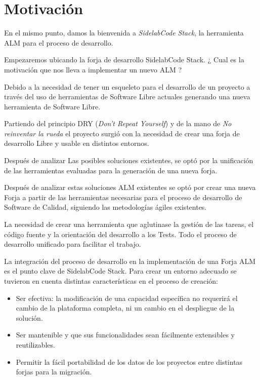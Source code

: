 \chapter{Motivaci\'on}
\label{chap:motivacion}

\par En el mismo punto, damos la bienvenida a \emph{SidelabCode Stack}, la herramienta ALM para el proceso de desarrollo.

\par Empezaremos ubicando la forja de desarrollo SidelabCode Stack. ¿ Cual es la motivaci\'on que nos lleva a implementar un nuevo ALM ?

\par Debido a la necesidad de tener un esqueleto para el desarrollo de un proyecto a trav\'es del uso de herramientas de Software Libre actuales generando una nueva herramienta de Software Libre.

\par Partiendo del principio DRY (\emph{Don't Repeat Yourself}) y de la mano de \emph{No reinventar la rueda} el proyecto surgi\'o con la necesidad de crear una forja de desarrollo Libre y usable en distintos entornos.

\par Despu\'es de analizar Las posibles soluciones existentes, se opt\'o por la unificaci\'on de las herramientas evaluadas para la generaci\'on de una nueva forja. 

\par Despu\'es de analizar estas soluciones ALM existentes se opt\'o por crear una nueva Forja a partir de las herramientas necesarias para el proceso de desarrollo de Software de Calidad, siguiendo las metodolog\'ias \'agiles existentes.

\par La necesidad de crear una herramienta que aglutinase la gestión de las tareas, el código fuente y la orientación del desarrollo a los Tests. Todo el proceso de desarrollo unificado para facilitar el trabajo.

\par La integraci\'on del proceso de desarrollo en la implementaci\'on de una Forja ALM es el punto clave de SidelabCode Stack. Para crear un entorno adecuado se tuvieron en cuenta distintas características en el proceso de creación:

\begin{itemize}
	\item Ser efectiva: la modificaci\'on de una capacidad espec\'ifica no requerir\'a el cambio de la plataforma completa, ni un cambio en el despliegue de la soluci\'on.
	\item Ser mantenible y que sus funcionalidades sean f\'acilmente extensibles y reutilizables.
	\item Permitir la f\'acil portabilidad de los datos de los proyectos entre distintas forjas para la migración.
\end{itemize}

